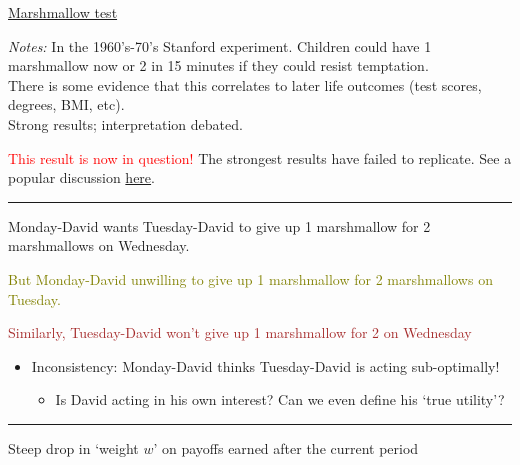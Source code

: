 \documentclass[]{article}
\providecommand{\tightlist}{%
  \setlength{\itemsep}{0pt}\setlength{\parskip}{0pt}}
\begin{document}
\href{https://youtu.be/d8M7Xzjy_m8?t=3}{Marshmallow test}

\emph{Notes:} In the 1960's-70's Stanford experiment. Children could
have 1 marshmallow now or 2 in 15 minutes if they could resist
temptation.\\
There is some evidence that this correlates to later life outcomes (test
scores, degrees, BMI, etc).\\
Strong results; interpretation debated.

\textcolor{red}{This result is now in question!} The strongest results
have failed to replicate. See a popular discussion
\href{https://www.vox.com/science-and-health/2018/6/6/17413000/marshmallow-test-replication-mischel-psychology}{here}.

\begin{center}\rule{0.5\linewidth}{\linethickness}\end{center}

Monday-David wants Tuesday-David to give up 1 marshmallow for 2
marshmallows on Wednesday.\\

\bigskip

\textcolor{olive}{But Monday-David unwilling to give up 1 marshmallow for 2 marshmallows on Tuesday.}\\

\bigskip

\textcolor{brown}{Similarly, Tuesday-David won't give up 1 marshmallow for 2 on Wednesday}

\bigskip

\begin{itemize}
\tightlist
\item
  Inconsistency: Monday-David thinks Tuesday-David is acting
  sub-optimally!

  \begin{itemize}
  \tightlist
  \item
    Is David acting in his own interest? Can we even define his `true
    utility'?
  \end{itemize}
\end{itemize}

\begin{center}\rule{0.5\linewidth}{\linethickness}\end{center}

\begin{description}
\tightlist
\item[Hyperbolic discounting (simple version)]
Steep drop in `weight \(w\)' on payoffs earned after the current period
\end{description}
\end{document}
